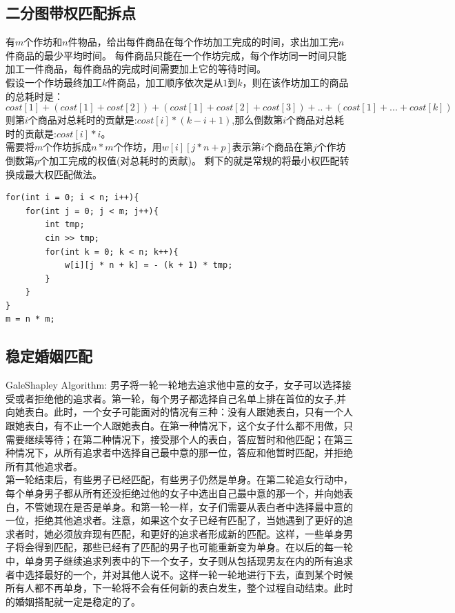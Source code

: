 \subsection{二分图带权匹配拆点}
有$m$个作坊和$n$件物品，给出每件商品在每个作坊加工完成的时间，求出加工完$n$件商品的最少平均时间。 每件商品只能在一个作坊完成，每个作坊同一时间只能加工一件商品，每件商品的完成时间需要加上它的等待时间。 \\

假设一个作坊最终加工$k$件商品，加工顺序依次是从$1$到$k$，则在该作坊加工的商品的总耗时是：
$$cost[1] + (cost[1] + cost[2]) + (cost[1] + cost[2] + cost[3]) + .. + (cost[1] + ... + cost[k])$$
则第$i$个商品对总耗时的贡献是:$cost[i] * ( k - i + 1)$,那么倒数第$i$个商品对总耗时的贡献是:$cost[i] * i$。 \\

需要将$m$个作坊拆成$n * m$个作坊，用$w[i][j * n + p]$表示第$i$个商品在第$j$个作坊倒数第$p$个加工完成的权值(对总耗时的贡献)。 剩下的就是常规的将最小权匹配转换成最大权匹配做法。
\begin{lstlisting}
for(int i = 0; i < n; i++){
    for(int j = 0; j < m; j++){
        int tmp;
        cin >> tmp;
        for(int k = 0; k < n; k++){
            w[i][j * n + k] = - (k + 1) * tmp;
        }
    }
}
m = n * m;
\end{lstlisting}

\subsection{稳定婚姻匹配}
GaleShapley Algorithm: 男子将一轮一轮地去追求他中意的女子，女子可以选择接受或者拒绝他的追求者。第一轮，每个男子都选择自己名单上排在首位的女子,并向她表白。此时，一个女子可能面对的情况有三种：没有人跟她表白，只有一个人跟她表白，有不止一个人跟她表白。在第一种情况下，这个女子什么都不用做，只需要继续等待；在第二种情况下，接受那个人的表白，答应暂时和他匹配；在第三种情况下，从所有追求者中选择自己最中意的那一位，答应和他暂时匹配，并拒绝所有其他追求者。 \\
第一轮结束后，有些男子已经匹配，有些男子仍然是单身。在第二轮追女行动中，每个单身男子都从所有还没拒绝过他的女子中选出自己最中意的那一个，并向她表白，不管她现在是否是单身。和第一轮一样，女子们需要从表白者中选择最中意的一位，拒绝其他追求者。注意，如果这个女子已经有匹配了，当她遇到了更好的追求者时，她必须放弃现有匹配，和更好的追求者形成新的匹配。这样，一些单身男子将会得到匹配，那些已经有了匹配的男子也可能重新变为单身。在以后的每一轮中，单身男子继续追求列表中的下一个女子，女子则从包括现男友在内的所有追求者中选择最好的一个，并对其他人说不。这样一轮一轮地进行下去，直到某个时候所有人都不再单身，下一轮将不会有任何新的表白发生，整个过程自动结束。此时的婚姻搭配就一定是稳定的了。 \\

